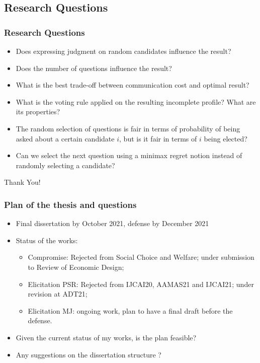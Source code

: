 \documentclass{beamer}
\begin{document}
\subsection{Research Questions}
\begin{frame}
	\frametitle{Research Questions}
	\begin{itemize}
		\item<1-> Does expressing judgment on random candidates influence the result? 
		\item<2-> Does the number of questions influence the result? 
		\item<3-> What is the best trade-off between communication cost and optimal result?
		\item<4-> What is the voting rule applied on the resulting incomplete profile? What are its properties?
		\item<5-> The random selection of questions is fair in terms of probability of being asked about a certain candidate $i$, but is it fair in terms of $i$ being elected?
		\item<6-> Can we select the next question using a minimax regret notion instead of randomly selecting a candidate?
	\end{itemize}
\end{frame}


\addtocounter{framenumber}{-1}
\begin{frame}[plain]
	\centering \color{darkred}\LARGE Thank You!
\end{frame}

\begin{frame}
	\frametitle{Plan of the thesis and questions}
	\begin{itemize}
		\item Final dissertation by October 2021, defense by December 2021
		\item Status of the works:
		\begin{itemize}
			\item Compromise: Rejected from Social Choice and Welfare; under submission to Review of Economic Design;
			\item Elicitation PSR: Rejected from IJCAI20, AAMAS21 and IJCAI21; under revision at ADT21;
			\item Elicitation MJ: ongoing work, plan to have a final draft before the defense.
		\end{itemize}
		\item Given the current status of my works, is the plan feasible?
		\item Any suggestions on the dissertation structure ?
	\end{itemize}
\end{frame}



 


\end{document}
